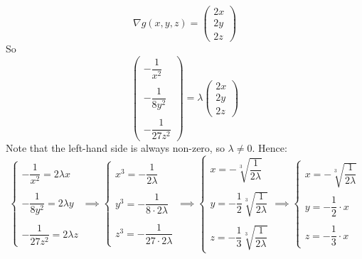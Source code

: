 \documentclass[a4paper,10pt]{article}
\begin{document}
\[
    \nabla g(x,y,z) = \begin{pmatrix}
        2x \\ 2y \\ 2z
    \end{pmatrix}
\]
So
\[
    \begin{pmatrix}
        -\dfrac{1}{x^2} \\ \\ -\dfrac{1}{8y^2} \\ \\ -\dfrac{1}{27z^2}
    \end{pmatrix}
    = \lambda
    \begin{pmatrix}
        2x \\ 2y\\ 2z
    \end{pmatrix}
\]
Note that the left-hand side is always non-zero, so $\lambda \neq 0$. Hence:
\[
    \begin{cases}
        -\dfrac{1}{x^2} = 2\lambda x  \\ \\
        -\dfrac{1}{8y^2} = 2\lambda y \\ \\
        -\dfrac{1}{27z^2} = 2\lambda z
    \end{cases} \implies
    \begin{cases}
        x^3 = -\dfrac{1}{2\lambda}       \\ \\
        y^3 = -\dfrac{1}{8\cdot2\lambda} \\ \\
        z^3 = -\dfrac{1}{27\cdot 2\lambda}
    \end{cases} \implies
    \begin{cases}
        x = -\sqrt[3]{\dfrac{1}{2\lambda}}             \\ \\
        y = -\dfrac{1}{2}\sqrt[3]{\dfrac{1}{2\lambda}} \\ \\
        z = -\dfrac{1}{3}\sqrt[3]{\dfrac{1}{2\lambda}}
    \end{cases} \implies
    \begin{cases}
        x = -\sqrt[3]{\dfrac{1}{2\lambda}} \\ \\
        y = -\dfrac{1}{2} \cdot x          \\ \\
        z = -\dfrac{1}{3} \cdot x
    \end{cases}
\]
\end{document}
